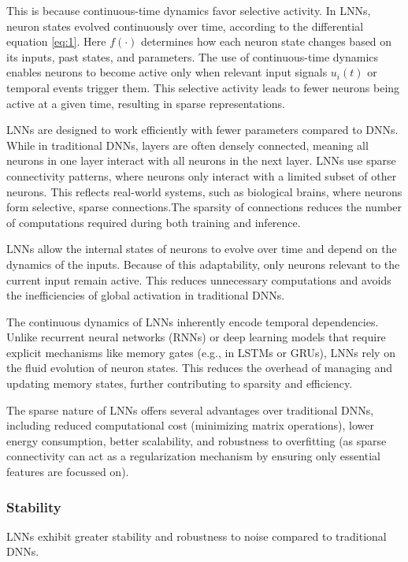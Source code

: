 This is because continuous-time dynamics favor selective activity. In LNNs, neuron states evolved continuously over time, according to the differential equation \ref{eq:1}. Here \(f(\cdot)\) determines how each neuron state changes based on its inputs, past states, and parameters. The use of continuous-time dynamics enables neurons to become active only when relevant input signals \(u_i(t)\) or temporal events trigger them. This selective activity leads to fewer neurons being active at a given time, resulting in sparse representations.

LNNs are designed to work efficiently with fewer parameters compared to DNNs. While in traditional DNNs, layers are often densely connected, meaning all neurons in one layer interact with all neurons in the next layer. LNNs use sparse connectivity patterns, where neurons only interact with a limited subset of other neurons. This reflects real-world systems, such as biological brains, where neurons form selective, sparse connections.The sparsity of connections reduces the number of computations required during both training and inference.

LNNs allow the internal states of neurons to evolve over time and depend on the dynamics of the inputs. Because of this adaptability, only neurons relevant to the current input remain active. This reduces unnecessary computations and avoids the inefficiencies of global activation in traditional DNNs.

The continuous dynamics of LNNs inherently encode temporal dependencies. Unlike recurrent neural networks (RNNs) or deep learning models that require explicit mechanisms like memory gates (e.g., in LSTMs or GRUs), LNNs rely on the fluid evolution of neuron states. This reduces the overhead of managing and updating memory states, further contributing to sparsity and efficiency.

The sparse nature of LNNs offers several advantages over traditional DNNs, including reduced computational cost (minimizing matrix operations), lower energy consumption, better scalability, and robustness to overfitting (as sparse connectivity can act as a regularization mechanism by ensuring only essential features are focussed on).

\subsubsection*{Stability}
LNNs exhibit greater stability and robustness to noise compared to traditional DNNs. 


